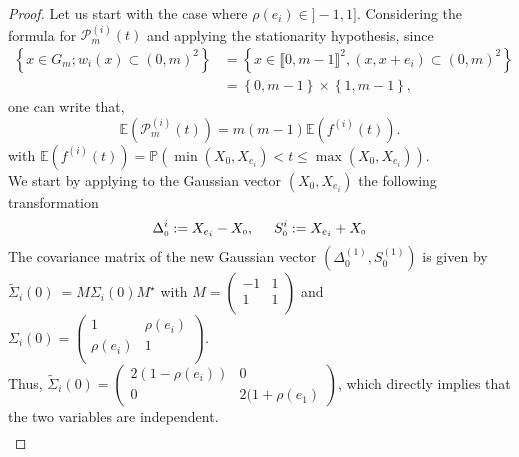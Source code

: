 \documentclass[12pt]{article}
\renewcommand{\tilde}{\widetilde}
\theoremstyle{Theorem}
\begin{document}
\begin{proof}
Let us start with the case where $\rho(e_{i}) \in ]-1,1]$. Considering the formula for $\mathcal{P}^{\scriptscriptstyle  (i)}_{m}(t)$ and applying the stationarity hypothesis, since
\begin{align*}
\left\{ x \in G_{m}; w_{i}(x) \subset (0,m)^{2}\right\} & = \left\{x \in \llbracket 0, m-1 \rrbracket^{2}, (x, x+e_i)\subset (0,m)^{2} \right\} \\ 
& = \left\{ 0, m-1 \right\} \times \left\{ 1, m - 1\right\},
\end{align*}
one can write that, 
\begin{equation}
\mathbb{E}\left(\mathcal{P}^{\scriptscriptstyle  (i)}_{m}(t) \right) = m(m-1)\mathbb{E}\left(f^{(i)}(t)\right).
\label{covarianeproof}
\end{equation}
 with $\mathbb{E}\left(f^{(i)}(t)\right) = \mathbb{P}\left(\min\left(X_{\scriptscriptstyle 0}, X_{e_i}\right) < t \leq \max\left(X_{\scriptscriptstyle 0}, X_{e_i}\right)\right)$. \\
 We start by applying to the Gaussian vector $\left(X_{\scriptscriptstyle 0}, X_{e_i}\right)$ the following transformation \begin{equation} \label{expressions} \Delta^{i}_{\scriptscriptstyle 0} := X_{e_i} - X_{\scriptscriptstyle 0}, \hspace{0.5cm} S^{i}_{\scriptscriptstyle 0} := X_{e_i} + X_{\scriptscriptstyle 0}\end{equation}
The covariance matrix of the new Gaussian vector $\left(\Delta^{\scriptscriptstyle (1)}_{\scriptscriptstyle 0}, S^{\scriptscriptstyle (1)}_{\scriptscriptstyle 0}\right)$ is given by ${\tilde{\Sigma}_{i}(0)~= M\Sigma_{i}(0) M^{\star}}$ with {\small $M = \begin{pmatrix}
-1 & 1 \\
1 & 1  \\
\end{pmatrix}$} and $\Sigma_{i}(0) = \begin{pmatrix} 1 & \rho(e_i) \\
\rho(e_i) & 1  \\ 
\end{pmatrix}.$ \\
Thus, $\tilde{\Sigma}_{i}(0) = \begin{pmatrix}  2(1-\rho(e_i)) & 0 \\ 0 & 2(1+\rho(e_1)  \end{pmatrix}$, which directly  implies that the two variables are independent.
{\small
\begin{align*}

\end{align*}}
\end{proof}
\end{document}
